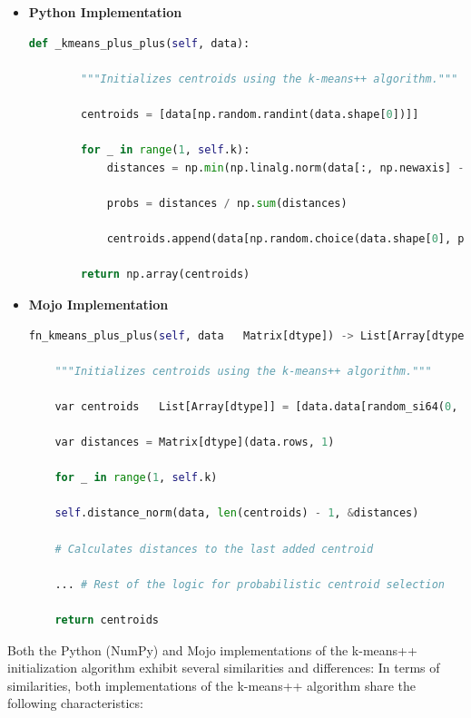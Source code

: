 \documentclass[conference]{IEEEtran}
\begin{document}
\begin{itemize}
\item \textbf{Python Implementation}
\begin{lstlisting}[language=Python]
    def _kmeans_plus_plus(self, data):

        """Initializes centroids using the k-means++ algorithm.""" 

        centroids = [data[np.random.randint(data.shape[0])]] 

        for _ in range(1, self.k):   
            distances = np.min(np.linalg.norm(data[:, np.newaxis] - centroids, axis=2), axis=1)**2

            probs = distances / np.sum(distances)

            centroids.append(data[np.random.choice(data.shape[0], p=probs)])

        return np.array(centroids)

\end{lstlisting}

\item \textbf{Mojo Implementation}

\begin{lstlisting}[language=Python]
    fn_kmeans_plus_plus(self, data   Matrix[dtype]) -> List[Array[dtype]]   

    """Initializes centroids using the k-means++ algorithm.""" 

    var centroids   List[Array[dtype]] = [data.data[random_si64(0, data.rows)]] 

    var distances = Matrix[dtype](data.rows, 1) 

    for _ in range(1, self.k)   

    self.distance_norm(data, len(centroids) - 1, &distances)  

    # Calculates distances to the last added centroid 

    ... # Rest of the logic for probabilistic centroid selection 

    return centroids 

\end{lstlisting}

\end{itemize}

Both the Python (NumPy) and Mojo implementations of the k-means++ initialization algorithm exhibit several similarities and differences:
In terms of similarities, both implementations of the k-means++ algorithm share the following characteristics:
\end{document}
